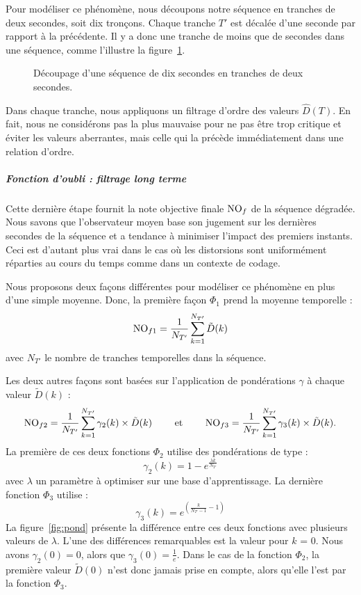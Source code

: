 Pour modéliser ce phénomène, nous découpons notre séquence en tranches de deux secondes, soit dix tronçons. Chaque tranche $T'$ est décalée d'une seconde par rapport à la précédente. Il y a donc une tranche de moins que de secondes dans une séquence, comme l'illustre la figure~\ref{fig:filtrageTemporelMT}.

\begin{figure}[htbp]
	\centering
	\begin{tikzpicture}
		
	\end{tikzpicture}
	\caption{Découpage d'une séquence de dix secondes en tranches de deux secondes.}
	\label{fig:filtrageTemporelMT}
\end{figure}

Dans chaque tranche, nous appliquons un filtrage d'ordre des valeurs $\hat{D}(T)$. En fait, nous ne considérons pas la plus mauvaise pour ne pas être trop critique et éviter les valeurs aberrantes, mais celle qui la précède immédiatement dans une relation d'ordre.


\subparagraph{Fonction d'oubli : filtrage long terme}
Cette dernière étape fournit la note objective finale $\NO_f$ de la séquence dégradée. Nous savons que l'observateur moyen base son jugement sur les dernières secondes de la séquence et a tendance à minimiser l'impact des premiers instants. Ceci est d'autant plus vrai dans le cas où les distorsions sont uniformément réparties au cours du temps comme dans un contexte de codage.

Nous proposons deux façons différentes pour modéliser ce phénomène en plus d'une simple moyenne. Donc, la première façon $\Phi_1$ prend la moyenne temporelle :
\begin{equation}
\NO_{f1} = \frac{1}{N_{T'}} \sum_{k=1}^{N_{T'}} \tilde{D}(k)
\end{equation}
%
avec $N_{T'}$ le nombre de tranches temporelles dans la séquence.

Les deux autres façons sont basées sur l'application de pondérations $\gamma$ à chaque valeur $\tilde{D}(k)$ :
\begin{equation}
\NO_{f2} = \frac{1}{N_{T'}} \sum_{k=1}^{N_{T'}} \gamma_2(k) \times \tilde{D}(k) \qquad \text{ et } \qquad \NO_{f3} = \frac{1}{N_{T'}} \sum_{k=1}^{N_{T'}} \gamma_3(k) \times \tilde{D}(k).
\end{equation}
%
La première de ces deux fonctions $\Phi_2$ utilise des pondérations de type :
\begin{equation}
\gamma_2(k) = 1 - e^{\frac{\lambda k}{N_{T'}}}
\end{equation}
%
avec $\lambda$ un paramètre à optimiser sur une base d'apprentissage. La dernière fonction $\Phi_3$ utilise :
\begin{equation}
\gamma_3(k) = e^{\left(\frac{k}{N_{T'} - 1} - 1\right)}
\end{equation}
%
La figure~\ref{fig:pond} présente la différence entre ces deux fonctions avec plusieurs valeurs de $\lambda$. L'une des différences remarquables est la valeur pour $k$ = 0. Nous avons $\gamma_2(0) = 0$, alors que $\gamma_3(0) = \frac{1}{e}$. Dans le cas de la fonction $\Phi_2$, la première valeur $\tilde{D}(0)$ n'est donc jamais prise en compte, alors qu'elle l'est par la fonction $\Phi_3$.

